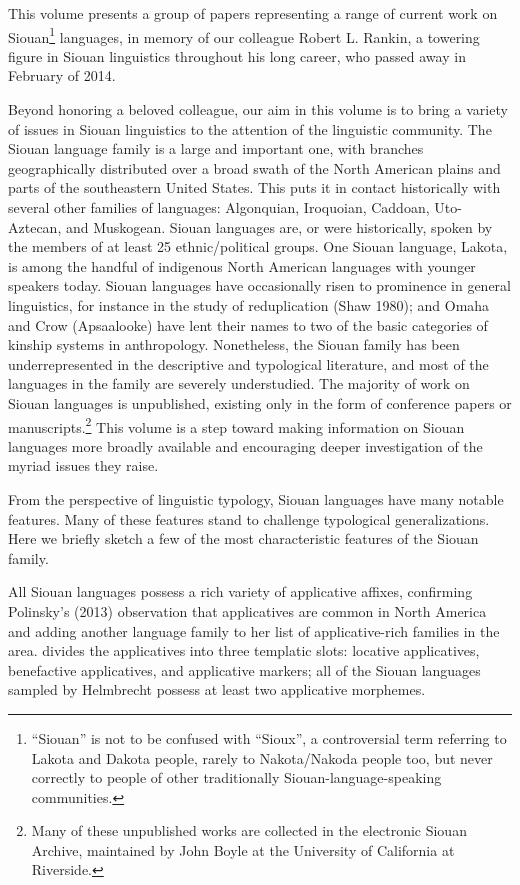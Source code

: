 \begin{refsection}

This volume presents a group of papers representing a range of current work on Siouan\footnote{``Siouan'' is not to be confused with ``Sioux'', a controversial term referring to Lakota and Dakota people, rarely to Nakota/Nakoda people too, but never correctly to people of other traditionally Siouan-language-speaking communities.} languages, in memory of our colleague Robert L. Rankin, a towering figure in Siouan linguistics throughout his long career, who passed away in February of 2014.


Beyond honoring a beloved colleague, our aim in this volume is to bring a variety of issues in Siouan linguistics to the attention of the linguistic community. The Siouan language family is a large and important one, with branches geographically distributed over a broad swath of the North American plains and parts of the southeastern United States. This puts it in contact historically with several other families of languages: Algonquian, Iroquoian, Caddoan, Uto-Aztecan, and Muskogean. Siouan languages are, or were historically, spoken by the members of at least 25 ethnic/political groups. One Siouan language, Lakota, is among the handful of indigenous North American languages with younger speakers today. Siouan languages have occasionally risen to prominence in general linguistics, for instance in the study of reduplication (Shaw 1980); and Omaha and Crow (Apsaalooke) have lent their names to two of the basic categories of kinship systems in anthropology. Nonetheless, the Siouan family has been underrepresented in the descriptive and typological literature, and most of the languages in the family are severely understudied. The majority of work on Siouan languages is unpublished, existing only in the form of conference papers or manuscripts.\footnote{Many of these unpublished works are collected in the electronic Siouan Archive, maintained by John Boyle at the University of California at Riverside.} This volume is a step toward making information on Siouan languages more broadly available and encouraging deeper investigation of the myriad issues they raise.


From the perspective of linguistic typology, Siouan languages have many notable features. Many of these features stand to challenge typological generalizations. Here we briefly sketch a few of the most characteristic features of the Siouan family.


All Siouan languages possess a rich variety of applicative affixes, confirming Polinsky's (2013) observation that applicatives are common in North America and adding another language family to her list of applicative-rich families in the area. \citet{Helmbrecht2006} divides the applicatives into three templatic slots: locative applicatives, benefactive applicatives, and applicative markers; all of the Siouan languages sampled by Helmbrecht possess at least two applicative morphemes.



\end{refsection}

